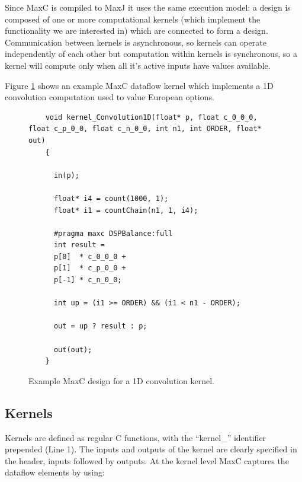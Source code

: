 Since MaxC is compiled to MaxJ it uses the same execution model: a
design is composed of one or more computational kernels (which
implement the functionality we are interested in) which are connected
to form a design. Communication between kernels is asynchronous, so
kernels can operate independently of each other but computation within
kernels is synchronous, so a kernel will compute only when all it's
active inputs have values available.

Figure \ref{fig:maxc-1dconv} shows an example MaxC dataflow kernel
which implements a 1D convolution computation used to value European
options.


\lstset{style=MaxC}

\begin{figure}
  \begin{lstlisting}
    void kernel_Convolution1D(float* p, float c_0_0_0, float c_p_0_0, float c_n_0_0, int n1, int ORDER, float* out)
    {

      in(p);

      float* i4 = count(1000, 1);
      float* i1 = countChain(n1, 1, i4);

      #pragma maxc DSPBalance:full
      int result =
      p[0]  * c_0_0_0 +
      p[1]  * c_p_0_0 +
      p[-1] * c_n_0_0;

      int up = (i1 >= ORDER) && (i1 < n1 - ORDER);

      out = up ? result : p;

      out(out);
    }
  \end{lstlisting}
  \caption{Example MaxC design for a 1D convolution kernel.}
  \label{fig:maxc-1dconv}
\end{figure}

\subsection{Kernels}

Kernels are defined as regular C functions, with the ``kernel\_''
identifier prepended (Line 1). The inputs and outputs of the kernel
are clearly specified in the header, inputs followed by outputs. At
the kernel level MaxC captures the dataflow elements by using:

